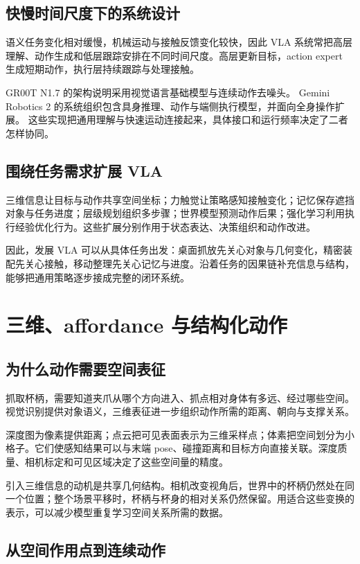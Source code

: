 \documentclass[UTF8,a4paper,11pt,oneside,openany,fontset=none]{ctexbook}
\begin{document}
\section{快慢时间尺度下的系统设计}

语义任务变化相对缓慢，机械运动与接触反馈变化较快，因此 VLA 系统常把高层理解、动作生成和低层跟踪安排在不同时间尺度。高层更新目标，action expert 生成短期动作，执行层持续跟踪与处理接触。

GR00T N1.7 的架构说明采用视觉语言基础模型与连续动作去噪头。\cite{R13} Gemini Robotics 2 的系统组织包含具身推理、动作与端侧执行模型，并面向全身操作扩展。\cite{R14} 这些实现把通用理解与快速运动连接起来，具体接口和运行频率决定了二者怎样协同。

\section{围绕任务需求扩展 VLA}

三维信息让目标与动作共享空间坐标；力触觉让策略感知接触变化；记忆保存遮挡对象与任务进度；层级规划组织多步骤；世界模型预测动作后果；强化学习利用执行经验优化行为。这些扩展分别作用于状态表达、决策组织和动作改进。

因此，发展 VLA 可以从具体任务出发：桌面抓放先关心对象与几何变化，精密装配先关心接触，移动整理先关心记忆与进度。沿着任务的因果链补充信息与结构，能够把通用策略逐步接成完整的闭环系统。

\chapter{三维、affordance 与结构化动作}

\section{为什么动作需要空间表征}

抓取杯柄，需要知道夹爪从哪个方向进入、抓点相对身体有多远、经过哪些空间。视觉识别提供对象语义，三维表征进一步组织动作所需的距离、朝向与支撑关系。

深度图为像素提供距离；点云把可见表面表示为三维采样点；体素把空间划分为小格子。它们使感知结果可以与末端 pose、碰撞距离和目标方向直接关联。深度质量、相机标定和可见区域决定了这些空间量的精度。

引入三维信息的动机是共享几何结构。相机改变视角后，世界中的杯柄仍然处在同一个位置；整个场景平移时，杯柄与杯身的相对关系仍然保留。用适合这些变换的表示，可以减少模型重复学习空间关系所需的数据。

\section{从空间作用点到连续动作}
\end{document}
